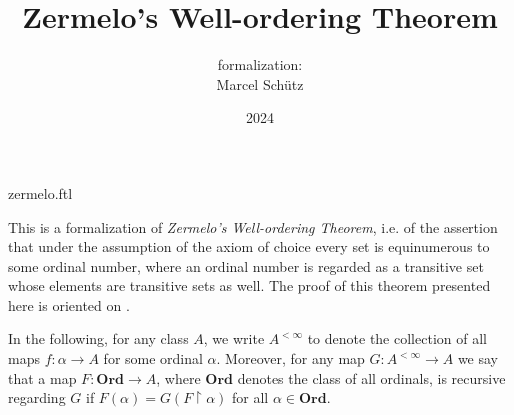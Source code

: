 \documentclass{article}
\title{Zermelo's Well-ordering Theorem}
\author{\Naproche formalization:\\[0.5em]Marcel Schütz}
\date{2024}
\newcommand\Ord{\textbf{Ord}}
\begin{document}
\begin{smodule}{zermelo.ftl}
  \maketitle
  \hidetlsnumbers


  \noindent This is a formalization of \textit{Zermelo's Well-ordering Theorem},
  i.e. of the assertion that under the assumption of the axiom of choice every
  set is equinumerous to some ordinal number, where an ordinal number is
  regarded as a transitive set whose elements are transitive sets as well.
  The proof of this theorem presented here is oriented on \cite{Koepke2018}.

  In the following, for any class $A$, we write $A^{< \infty}$ to
  denote the collection of all maps $f : \alpha \to A$ for some ordinal
  $\alpha$.
  Moreover, for any map $G : A^{< \infty} \to A$ we say that a map $F : \Ord \to
  A$, where $\Ord$ denotes the class of all ordinals, is recursive regarding $G$
  if $F(\alpha) = G(F \restriction \alpha)$ for all $\alpha \in \Ord$.


  \printbibliography
\end{smodule}
\end{document}
